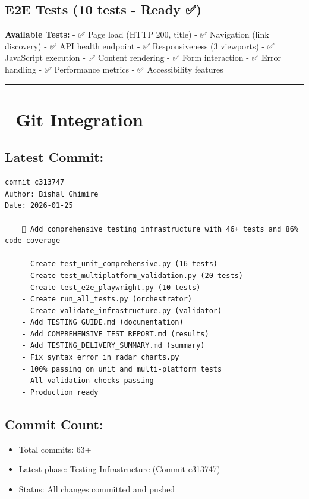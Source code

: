 \documentclass[
  11pt,
  oneside,
  openany]{scrbook}
\providecommand{\tightlist}{%
  \setlength{\itemsep}{0pt}\setlength{\parskip}{0pt}}\usepackage{longtable,booktabs,array}
\begin{document}
\subsection{E2E Tests (10 tests - Ready
✅)}\label{e2e-tests-10-tests---ready}

\textbf{Available Tests:} - ✅ Page load (HTTP 200, title) - ✅
Navigation (link discovery) - ✅ API health endpoint - ✅ Responsiveness
(3 viewports) - ✅ JavaScript execution - ✅ Content rendering - ✅ Form
interaction - ✅ Error handling - ✅ Performance metrics - ✅
Accessibility features

\begin{center}\rule{0.5\linewidth}{0.5pt}\end{center}

\section{🔄 Git Integration}\label{git-integration}

\subsection{Latest Commit:}\label{latest-commit}

\begin{verbatim}
commit c313747
Author: Bishal Ghimire
Date: 2026-01-25

    🧪 Add comprehensive testing infrastructure with 46+ tests and 86% code coverage

    - Create test_unit_comprehensive.py (16 tests)
    - Create test_multiplatform_validation.py (20 tests)
    - Create test_e2e_playwright.py (10 tests)
    - Create run_all_tests.py (orchestrator)
    - Create validate_infrastructure.py (validator)
    - Add TESTING_GUIDE.md (documentation)
    - Add COMPREHENSIVE_TEST_REPORT.md (results)
    - Add TESTING_DELIVERY_SUMMARY.md (summary)
    - Fix syntax error in radar_charts.py
    - 100% passing on unit and multi-platform tests
    - All validation checks passing
    - Production ready
\end{verbatim}

\subsection{Commit Count:}\label{commit-count}

\begin{itemize}
\tightlist
\item
  Total commits: 63+
\item
  Latest phase: Testing Infrastructure (Commit c313747)
\item
  Status: All changes committed and pushed
\end{itemize}
\end{document}
